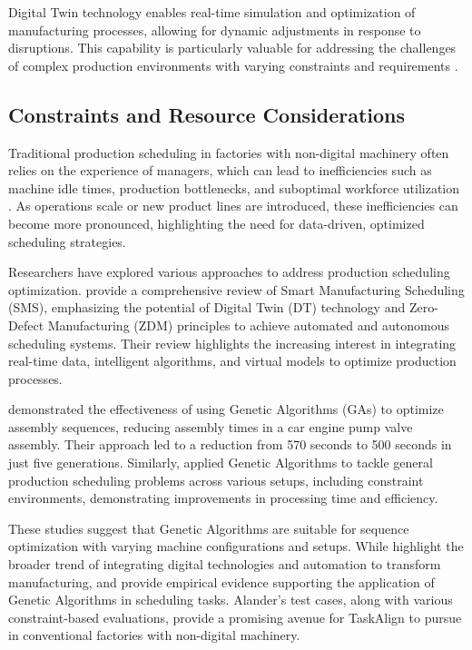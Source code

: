 Digital Twin technology enables real-time simulation and optimization of manufacturing processes, allowing for dynamic adjustments in response to disruptions. This capability is particularly valuable for addressing the challenges of complex production environments with varying constraints and requirements \cite{serranoruiz2023}.

\subsection{Constraints and Resource Considerations}

Traditional production scheduling in factories with non-digital machinery often relies on the experience of managers, which can lead to inefficiencies such as machine idle times, production bottlenecks, and suboptimal workforce utilization \cite{serrano2021smart}. As operations scale or new product lines are introduced, these inefficiencies can become more pronounced, highlighting the need for data-driven, optimized scheduling strategies.

Researchers have explored various approaches to address production scheduling optimization. \citet{serrano2021smart} provide a comprehensive review of Smart Manufacturing Scheduling (SMS), emphasizing the potential of Digital Twin (DT) technology and Zero-Defect Manufacturing (ZDM) principles to achieve automated and autonomous scheduling systems. Their review highlights the increasing interest in integrating real-time data, intelligent algorithms, and virtual models to optimize production processes.

\citet{alharbi2018solving} demonstrated the effectiveness of using Genetic Algorithms (GAs) to optimize assembly sequences, reducing assembly times in a car engine pump valve assembly. Their approach led to a reduction from 570 seconds to 500 seconds in just five generations. Similarly, \citet{alanderoptimizing} applied Genetic Algorithms to tackle general production scheduling problems across various setups, including constraint environments, demonstrating improvements in processing time and efficiency.

These studies suggest that Genetic Algorithms are suitable for sequence optimization with varying machine configurations and setups. While \citet{serrano2021smart} highlight the broader trend of integrating digital technologies and automation to transform manufacturing, \citet{alharbi2018solving} and \citet{alanderoptimizing} provide empirical evidence supporting the application of Genetic Algorithms in scheduling tasks. Alander's test cases, along with various constraint-based evaluations, provide a promising avenue for TaskAlign to pursue in conventional factories with non-digital machinery.



